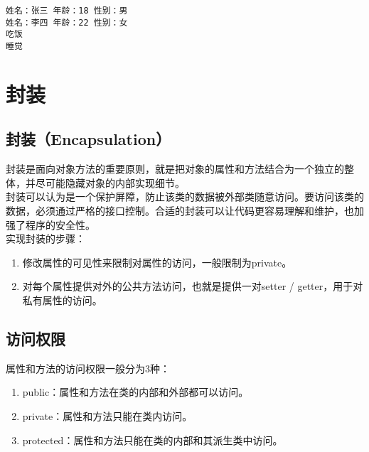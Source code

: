 \begin{tcolorbox}
	\begin{verbatim}
姓名：张三 年龄：18 性别：男
姓名：李四 年龄：22 性别：女
吃饭
睡觉
	\end{verbatim}
\end{tcolorbox}

\newpage

\section{封装}

\subsection{封装（Encapsulation）}

封装是面向对象方法的重要原则，就是把对象的属性和方法结合为一个独立的整体，并尽可能隐藏对象的内部实现细节。\\

封装可以认为是一个保护屏障，防止该类的数据被外部类随意访问。要访问该类的数据，必须通过严格的接口控制。合适的封装可以让代码更容易理解和维护，也加强了程序的安全性。\\

实现封装的步骤：

\begin{enumerate}
	\item 修改属性的可见性来限制对属性的访问，一般限制为private。
	\item 对每个属性提供对外的公共方法访问，也就是提供一对setter / getter，用于对私有属性的访问。
\end{enumerate}

\vspace{0.5cm}

\subsection{访问权限}

属性和方法的访问权限一般分为3种：

\begin{enumerate}
	\item public：属性和方法在类的内部和外部都可以访问。
	\item private：属性和方法只能在类内访问。
	\item protected：属性和方法只能在类的内部和其派生类中访问。
\end{enumerate}

\vspace{0.5cm}


